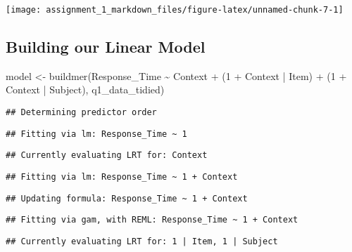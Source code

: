 \documentclass[
]{article}
\newenvironment{Shaded}{\begin{snugshade}}{\end{snugshade}}
\newcommand{\DecValTok}[1]{\textcolor[rgb]{0.00,0.00,0.81}{#1}}
\newcommand{\FunctionTok}[1]{\textcolor[rgb]{0.00,0.00,0.00}{#1}}
\newcommand{\NormalTok}[1]{#1}
\newcommand{\OtherTok}[1]{\textcolor[rgb]{0.56,0.35,0.01}{#1}}
\newcommand{\SpecialCharTok}[1]{\textcolor[rgb]{0.00,0.00,0.00}{#1}}
\begin{document}
\texttt{[image: assignment\_1\_markdown\_files/figure-latex/unnamed-chunk-7-1]}

\hypertarget{building-our-linear-model}{%
\subsection{Building our Linear Model}\label{building-our-linear-model}}

\begin{Shaded}
\begin{Highlighting}[]
\NormalTok{model }\OtherTok{\textless{}{-}} \FunctionTok{buildmer}\NormalTok{(Response\_Time }\SpecialCharTok{\textasciitilde{}}\NormalTok{ Context }\SpecialCharTok{+} 
\NormalTok{                    (}\DecValTok{1} \SpecialCharTok{+}\NormalTok{ Context }\SpecialCharTok{|}\NormalTok{ Item) }\SpecialCharTok{+}
\NormalTok{                    (}\DecValTok{1} \SpecialCharTok{+}\NormalTok{ Context }\SpecialCharTok{|}\NormalTok{ Subject),}
\NormalTok{                  q1\_data\_tidied)}
\end{Highlighting}
\end{Shaded}

\begin{verbatim}
## Determining predictor order
\end{verbatim}

\begin{verbatim}
## Fitting via lm: Response_Time ~ 1
\end{verbatim}

\begin{verbatim}
## Currently evaluating LRT for: Context
\end{verbatim}

\begin{verbatim}
## Fitting via lm: Response_Time ~ 1 + Context
\end{verbatim}

\begin{verbatim}
## Updating formula: Response_Time ~ 1 + Context
\end{verbatim}

\begin{verbatim}
## Fitting via gam, with REML: Response_Time ~ 1 + Context
\end{verbatim}

\begin{verbatim}
## Currently evaluating LRT for: 1 | Item, 1 | Subject
\end{verbatim}
\end{document}

